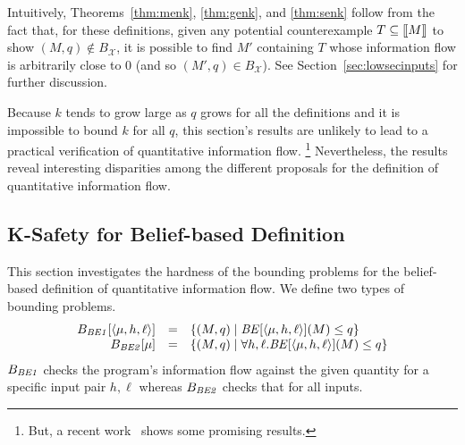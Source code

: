 \documentclass{llncs}
\newcommand{\aset}[1]{\{{#1}\}}
\newcommand{\aseq}[1]{\langle#1\rangle}
\newcommand{\sembrack}[1]{[\hspace*{-1.2pt}[#1]\hspace*{-1.2pt}]}
\begin{document}
Intuitively, Theorems~\ref{thm:menk}, \ref{thm:genk}, and
\ref{thm:senk} follow from the fact that, for these definitions, given
any potential counterexample $T \subseteq \sembrack{M}$ to show $(M,q)
\notin B_\mathcal{X}$, it is possible to find $M'$ containing $T$
whose information flow is arbitrarily close to $0$ (and so $(M',q) \in
B_\mathcal{X}$).  See Section~\ref{sec:lowsecinputs} for further
discussion.

Because $k$ tends to grow large as $q$ grows for all the definitions
and it is impossible to bound $k$ for all $q$, this section's results
are unlikely to lead to a practical verification of quantitative
information flow.  \footnote{But, a recent
  work~\cite{DBLP:conf/acsac/Heusser2010} shows some promising
  results.}  Nevertheless, the results reveal interesting disparities
among the different proposals for the definition of quantitative
information flow.

\subsection{K-Safety for Belief-based Definition}

\label{sec:ksafetybelief}

This section investigates the hardness of the bounding problems for
the belief-based definition of quantitative information flow.  We
define two types of bounding problems.
\[
\begin{array}{rcl}
B_{\it BE1}[\aseq{\mu,h,\ell}]&=&\aset{(M,q)\mid {\it
BE}[\aseq{\mu,h,\ell}](M)\le q}\\ 
B_{\it BE2}[\mu]&=&\aset{(M,q)\mid \forall h,\ell.{\it
BE}[\aseq{\mu,h,\ell}](M)\le q}
\end{array}
\]
$B_{\it BE1}$ checks the program's information flow against the given
quantity for a specific input pair $h,\ell$ whereas $B_{\it BE2}$
checks that for all inputs.
\end{document}
